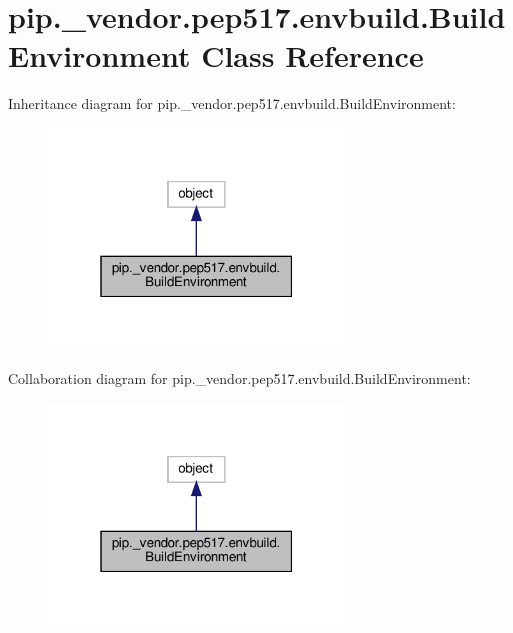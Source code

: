\hypertarget{classpip_1_1__vendor_1_1pep517_1_1envbuild_1_1BuildEnvironment}{}\section{pip.\+\_\+vendor.\+pep517.\+envbuild.\+Build\+Environment Class Reference}
\label{classpip_1_1__vendor_1_1pep517_1_1envbuild_1_1BuildEnvironment}


Inheritance diagram for pip.\+\_\+vendor.\+pep517.\+envbuild.\+Build\+Environment\+:
\nopagebreak
\begin{figure}[H]
\begin{center}
\leavevmode
\includegraphics[width=223pt]{classpip_1_1__vendor_1_1pep517_1_1envbuild_1_1BuildEnvironment__inherit__graph}
\end{center}
\end{figure}


Collaboration diagram for pip.\+\_\+vendor.\+pep517.\+envbuild.\+Build\+Environment\+:
\nopagebreak
\begin{figure}[H]
\begin{center}
\leavevmode
\includegraphics[width=223pt]{classpip_1_1__vendor_1_1pep517_1_1envbuild_1_1BuildEnvironment__coll__graph}
\end{center}
\end{figure}
